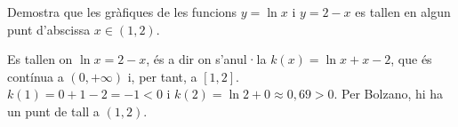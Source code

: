 \begin{apartats}
\begin{nomesllarg}
Demostra que les gràfiques de les funcions $y=\ln x$ i $y=2-x$ es tallen en algun punt
d'abscissa $x\in(1,2)$.

\begin{solucio}
Es tallen on $\ln x=2-x$, és a dir on s'anul·la $k(x)=\ln x+x-2$, que és contínua a $(0,+\infty)$
i, per tant, a $[1,2]$.\\
$k(1)=0+1-2=-1<0$ i $k(2)=\ln2+0\approx0{,}69>0$. Per Bolzano, hi ha un punt de tall a $(1,2)$.
\end{solucio}
\end{nomesllarg}

\end{apartats}
